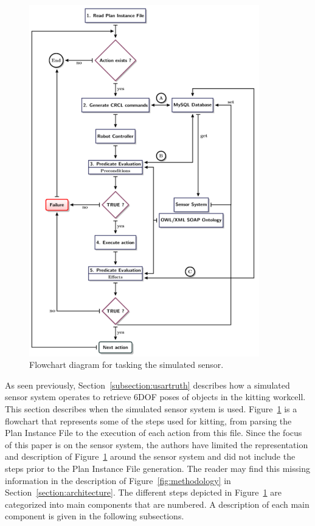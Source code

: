 
\begin{figure}[!t!h!b!]
\centering
\includegraphics[width=10cm]{images/flowchart.pdf}
\caption{Flowchart diagram for tasking the simulated sensor.}
\label{fig:sensor}
\end{figure}

As seen previously, Section~\ref{subsection:usartruth} describes how a simulated sensor system operates to retrieve 6DOF poses of objects in the kitting workcell. This section describes when the simulated sensor system is used. Figure~\ref{fig:sensor} is a flowchart that represents some of the steps used for kitting, from parsing the \textsf{Plan Instance File} to the execution of each action from this file. Since the focus of this paper is on the sensor system, the authors have limited the representation and description of Figure~\ref{fig:sensor} around the sensor system and did not include the steps prior to the \textsf{Plan Instance File} generation. The reader may find this missing information in the description of Figure~\ref{fig:methodology} in Section~\ref{section:architecture}. The different steps depicted in Figure~\ref{fig:sensor} are categorized into main components that are numbered. A description of each main component is given in the following subsections.

